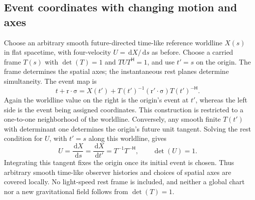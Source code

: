 \documentclass[11pt]{article}
\newcommand{\pv}[1]{{#1}}
\newcommand{\vstyle}[1]{{\bm{\mathrm{#1}}}}
\newcommand{\pT}{\pv{T}}
\newcommand{\pU}{\pv{U}}
\newcommand{\pX}{\pv{X}}
\numberwithin{equation}{section}
\newcommand{\dotprod}{\cdot}
\newcommand{\bsig}{\vstyle{\sigma}}
\newcommand{\br}{\vstyle{r}}
\newcommand{\dd}{\,\mathrm d}
\begin{document}
\subsection{Event coordinates with changing motion and axes}
\label{sec:general-observer-chart}

Choose an arbitrary smooth future-directed time-like reference
worldline $\pX(s)$ in flat spacetime, with four-velocity
$\pU=\dd\pX/\dd s$ as before.
Choose a carried frame $\pT(s)$ with $\det(\pT)=1$ and
$\pT\pU\pT^{\mathsf H}=1$, and use $t'=s$ on the origin.
The frame determines the spatial axes; the
instantaneous rest planes determine simultaneity. The event map is
\begin{equation}
 t+\br\dotprod\bsig
 =\pX(t')+\pT(t')^{-1}(\br'\dotprod\bsig)
 \pT(t')^{-\mathsf H}.
 \label{eq:general-observer-event-map}
\end{equation}
Again the worldline value on the right is the origin's event at $t'$,
whereas the left side is the event being assigned coordinates. This
construction is restricted to a one-to-one neighborhood of the worldline.
Conversely, any smooth finite $\pT(t')$ with determinant one determines
the origin's future unit tangent. Solving the rest condition for
$\pU$, with $t'=s$ along this worldline, gives
\[
 \pU=\frac{\dd\pX}{\dd s}
 =\frac{\dd\pX}{\dd t'}
 =\pT^{-1}\pT^{-\mathsf H},\qquad \det(\pU)=1.
\]
Integrating this tangent fixes the origin once its initial event is
chosen. Thus arbitrary smooth time-like observer histories and choices
of spatial axes are covered locally. No light-speed rest frame is
included, and neither a global chart nor a new gravitational field
follows from $\det(\pT)=1$.
\end{document}

